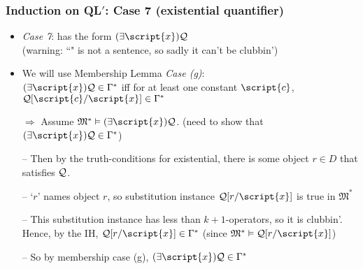 \begin{frame}
\frametitle{Induction on QL$'$: Case 7 (existential quantifier)}

\begin{itemize}[<+->]

\item \emph{Case 7}:  has the form $\qt{\exists}{\script{x}} \metav{Q}$ \\ (warning: ``" is not a sentence, so sadly it can't be clubbin')

\item We will use Membership Lemma \emph{Case (g)}: \\ $\qt{\exists}{\script{x}} \metav{Q} \in \Gamma^{\ast}$ iff for at least one constant $\script{c}$, $\metav{Q}[\script{c}/\script{x}] \in \Gamma^{\ast}$


\bigskip

\item[$\Rightarrow$] Assume $\mathfrak{M}^{\ast} \entails \qt{\exists}{\script{x}} \metav{Q}$. (need to show that $\qt{\exists}{\script{x}} \metav{Q} \in \Gamma^{\ast}$)
\item[] -- Then by the truth-conditions for existential, there is some object $r \in D$ that satisfies $\mathcal{Q}$. 
\item[] -- `$r$' names object $r$, so substitution instance $\metav{Q}\substitute{\script{x}}{r}$ is true in $\mathfrak{M}^{\ast}$
\item[] -- This substitution instance has less than $k+1$-operators, so it is clubbin'. Hence, by the IH, $\metav{Q}\substitute{\script{x}}{r} \in \Gamma^{\ast}$ (since $\mathfrak{M}^{\ast} \entails \metav{Q}\substitute{\script{x}}{r}$)

\medskip

\item[] -- So by membership case (g), $\qt{\exists}{\script{x}} \metav{Q} \in \Gamma^{\ast}$ 


\end{itemize}
\end{frame}

